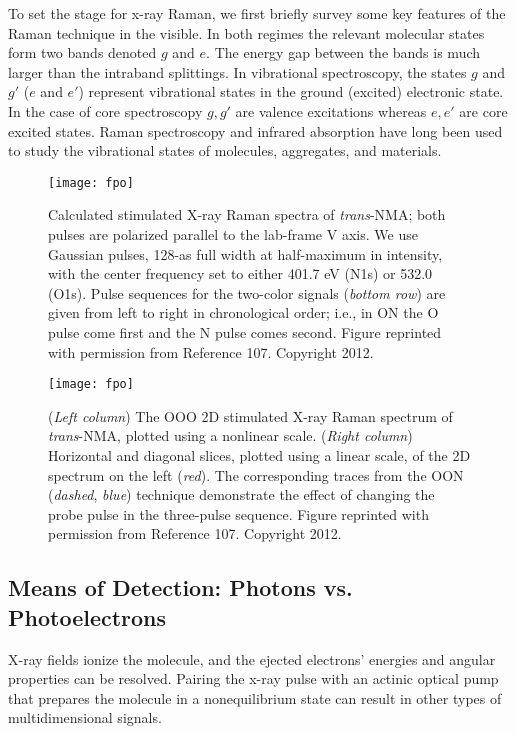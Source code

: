 \documentclass{ar-1col}
\begin{document}
To set the stage for x-ray Raman, we first briefly survey some key features of the Raman
technique in the visible.  In both regimes the relevant molecular states form two bands
denoted $g$ and $e.$  The energy gap between the bands is much larger than the intraband
splittings.  In vibrational spectroscopy, the states $g$ and $g'$ ($e$ and $e'$)
represent vibrational states in the ground (excited) electronic state.
In the case of core spectroscopy $g,g'$ are valence excitations whereas $e,e'$ are core excited states.
Raman spectroscopy and infrared absorption
have long been used to study the vibrational states of molecules,
aggregates,\cite{glatzel_electronic_2004} and
materials.\cite{icors2010}

\begin{figure}
\texttt{[image: fpo]}
\caption{Calculated stimulated X-ray Raman spectra of {\it trans}-NMA; both pulses are polarized parallel to the lab-frame V axis. We use Gaussian pulses, 128-as full width at half-maximum in intensity, with the center frequency set to either 401.7 eV (N1s) or 532.0 (O1s). Pulse sequences for the two-color signals ({\it bottom row}) are given from left to right in chronological order; i.e., in ON the O pulse come first and the N pulse comes second. Figure reprinted with permission from Reference 107. Copyright 2012.}\label{fig3}
\end{figure}


\begin{sidewaysfigure}
\texttt{[image: fpo]}
\caption{({\it Left column}) The OOO 2D stimulated X-ray Raman spectrum of {\it trans}-NMA, plotted using a nonlinear scale. ({\it Right column}) Horizontal and diagonal slices, plotted using a linear scale, of the 2D spectrum on the left ({\it red}). The corresponding traces from the OON ({\it dashed}, {\it blue}) technique demonstrate the effect of changing the probe pulse in the three-pulse sequence. Figure reprinted with permission from Reference 107. Copyright 2012.}\label{fig4}
\end{sidewaysfigure}



\subsection{Means of Detection: Photons vs. Photoelectrons}

X-ray fields ionize the molecule, and the
ejected electrons' energies and angular properties can be
resolved. %
Pairing the x-ray pulse with an actinic optical pump that prepares
the molecule in a nonequilibrium state can result in other types of
multidimensional signals.
\end{document}
